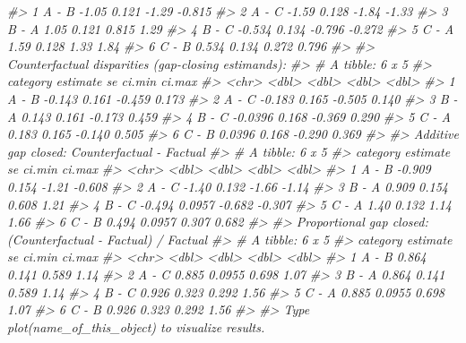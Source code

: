 \documentclass[
]{article}
\newenvironment{Shaded}{\begin{snugshade}}{\end{snugshade}}
\newcommand{\CommentTok}[1]{\textcolor[rgb]{0.56,0.35,0.01}{\textit{#1}}}
\begin{document}
\begin{Shaded}
\begin{Highlighting}[]
\CommentTok{\#\textgreater{} 1 A {-} B      {-}1.05  0.121 {-}1.29  {-}0.815}
\CommentTok{\#\textgreater{} 2 A {-} C      {-}1.59  0.128 {-}1.84  {-}1.33 }
\CommentTok{\#\textgreater{} 3 B {-} A       1.05  0.121  0.815  1.29 }
\CommentTok{\#\textgreater{} 4 B {-} C      {-}0.534 0.134 {-}0.796 {-}0.272}
\CommentTok{\#\textgreater{} 5 C {-} A       1.59  0.128  1.33   1.84 }
\CommentTok{\#\textgreater{} 6 C {-} B       0.534 0.134  0.272  0.796}
\CommentTok{\#\textgreater{} }
\CommentTok{\#\textgreater{} Counterfactual disparities (gap{-}closing estimands):}
\CommentTok{\#\textgreater{} \# A tibble: 6 x 5}
\CommentTok{\#\textgreater{}   category estimate    se ci.min ci.max}
\CommentTok{\#\textgreater{}   \textless{}chr\textgreater{}       \textless{}dbl\textgreater{} \textless{}dbl\textgreater{}  \textless{}dbl\textgreater{}  \textless{}dbl\textgreater{}}
\CommentTok{\#\textgreater{} 1 A {-} B     {-}0.143  0.161 {-}0.459  0.173}
\CommentTok{\#\textgreater{} 2 A {-} C     {-}0.183  0.165 {-}0.505  0.140}
\CommentTok{\#\textgreater{} 3 B {-} A      0.143  0.161 {-}0.173  0.459}
\CommentTok{\#\textgreater{} 4 B {-} C     {-}0.0396 0.168 {-}0.369  0.290}
\CommentTok{\#\textgreater{} 5 C {-} A      0.183  0.165 {-}0.140  0.505}
\CommentTok{\#\textgreater{} 6 C {-} B      0.0396 0.168 {-}0.290  0.369}
\CommentTok{\#\textgreater{} }
\CommentTok{\#\textgreater{} Additive gap closed: Counterfactual {-} Factual}
\CommentTok{\#\textgreater{} \# A tibble: 6 x 5}
\CommentTok{\#\textgreater{}   category estimate     se ci.min ci.max}
\CommentTok{\#\textgreater{}   \textless{}chr\textgreater{}       \textless{}dbl\textgreater{}  \textless{}dbl\textgreater{}  \textless{}dbl\textgreater{}  \textless{}dbl\textgreater{}}
\CommentTok{\#\textgreater{} 1 A {-} B      {-}0.909 0.154  {-}1.21  {-}0.608}
\CommentTok{\#\textgreater{} 2 A {-} C      {-}1.40  0.132  {-}1.66  {-}1.14 }
\CommentTok{\#\textgreater{} 3 B {-} A       0.909 0.154   0.608  1.21 }
\CommentTok{\#\textgreater{} 4 B {-} C      {-}0.494 0.0957 {-}0.682 {-}0.307}
\CommentTok{\#\textgreater{} 5 C {-} A       1.40  0.132   1.14   1.66 }
\CommentTok{\#\textgreater{} 6 C {-} B       0.494 0.0957  0.307  0.682}
\CommentTok{\#\textgreater{} }
\CommentTok{\#\textgreater{} Proportional gap closed: (Counterfactual {-} Factual) / Factual}
\CommentTok{\#\textgreater{} \# A tibble: 6 x 5}
\CommentTok{\#\textgreater{}   category estimate     se ci.min ci.max}
\CommentTok{\#\textgreater{}   \textless{}chr\textgreater{}       \textless{}dbl\textgreater{}  \textless{}dbl\textgreater{}  \textless{}dbl\textgreater{}  \textless{}dbl\textgreater{}}
\CommentTok{\#\textgreater{} 1 A {-} B       0.864 0.141   0.589   1.14}
\CommentTok{\#\textgreater{} 2 A {-} C       0.885 0.0955  0.698   1.07}
\CommentTok{\#\textgreater{} 3 B {-} A       0.864 0.141   0.589   1.14}
\CommentTok{\#\textgreater{} 4 B {-} C       0.926 0.323   0.292   1.56}
\CommentTok{\#\textgreater{} 5 C {-} A       0.885 0.0955  0.698   1.07}
\CommentTok{\#\textgreater{} 6 C {-} B       0.926 0.323   0.292   1.56}
\CommentTok{\#\textgreater{} }
\CommentTok{\#\textgreater{} Type plot(name\_of\_this\_object) to visualize results.}
\end{Highlighting}
\end{Shaded}
\end{document}
